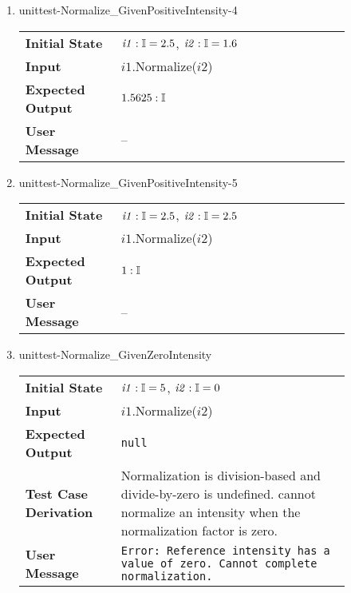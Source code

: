 \begin{enumerate}
    \item{unittest-Normalize\_GivenPositiveIntensity-4}
    \begin{table}[H]
        \centering
        \begin{tabular}{P{0.25\linewidth}P{0.6\linewidth}}
            \toprule
            \textbf{Initial State} & $\mathit{i1} : \mathbb{I} =
            2.5$, $\mathit{i2} : \mathbb{I} = 1.6$ \\
            \textbf{Input} &
            $\mathit{i1}$.Normalize($\mathit{i2}$) \\
            \midrule
            \textbf{Expected Output} & $1.5625 : \mathbb{I}$ \\
            \textbf{User Message} & -- \\ \bottomrule
        \end{tabular}
    \end{table}

    \item{unittest-Normalize\_GivenPositiveIntensity-5}
    \begin{table}[H]
        \centering
        \begin{tabular}{P{0.25\linewidth}P{0.6\linewidth}}
            \toprule
            \textbf{Initial State} & $\mathit{i1} : \mathbb{I} =
            2.5$, $\mathit{i2} : \mathbb{I} = 2.5$ \\
            \textbf{Input} &
            $\mathit{i1}$.Normalize($\mathit{i2}$) \\
            \midrule
            \textbf{Expected Output} & $1 : \mathbb{I}$ \\
            \textbf{User Message} & -- \\ \bottomrule
        \end{tabular}
    \end{table}

    \item{unittest-Normalize\_GivenZeroIntensity}
    \begin{table}[H]
        \centering
        \begin{tabular}{P{0.25\linewidth}P{0.6\linewidth}}
            \toprule
            \textbf{Initial State} & $\mathit{i1} : \mathbb{I} = 5$,
            $\mathit{i2} : \mathbb{I} = 0$ \\
            \textbf{Input} &
            $\mathit{i1}$.Normalize($\mathit{i2}$) \\
            \midrule
            \textbf{Expected Output} & \texttt{null} \\
            \textbf{Test Case Derivation} & Normalization is division-based and
            divide-by-zero is undefined. \progname{} cannot normalize an
            intensity when the normalization factor is zero. \\
            \textbf{User Message} & \texttt{Error: Reference intensity has a
                value of zero. Cannot complete normalization.} \\ \bottomrule
        \end{tabular}
    \end{table}


\end{enumerate}
